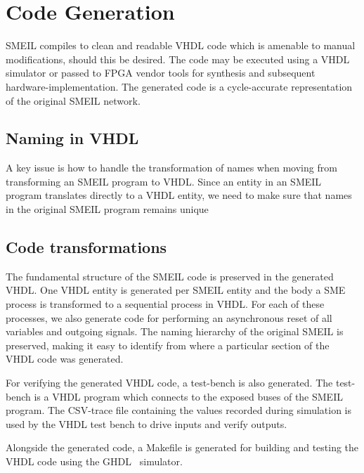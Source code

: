 \chapter{Code Generation}
\label{sec:codegen}
SMEIL compiles to clean and readable VHDL code which is amenable to manual
modifications, should this be desired. The code may be executed using a VHDL
simulator or passed to FPGA vendor tools for synthesis and subsequent
hardware-implementation. The generated code is a cycle-accurate representation
of the original SMEIL network.

\section{Naming in VHDL}
A key issue is how to handle the transformation of names when moving from
transforming an SMEIL program to VHDL. Since an entity in an SMEIL program
translates directly to a VHDL entity, we need to make sure that names in the
original SMEIL program remains unique

\section{Code transformations}

The fundamental structure of the SMEIL code is preserved in the generated
VHDL. One VHDL entity is generated per SMEIL entity and the body a SME process
is transformed to a sequential process in VHDL. For each of these processes, we
also generate code for performing an asynchronous reset of all variables and
outgoing signals. The naming hierarchy of the original SMEIL is preserved,
making it easy to identify from where a particular section of the VHDL code was
generated.

For verifying the generated VHDL code, a test-bench is also generated. The
test-bench is a VHDL program which connects to the {\ttfamily exposed} buses of
the SMEIL program. The CSV-trace file containing the values recorded during
simulation is used by the VHDL test bench to drive inputs and verify outputs.

Alongside the generated code, a {\ttfamily Makefile} is generated for building
and testing the VHDL code using the GHDL~\cite{ghdl} simulator.

